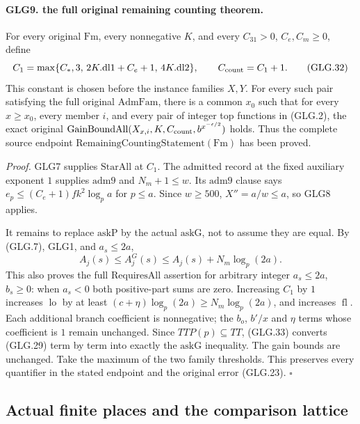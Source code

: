 \documentclass[11pt,a4paper]{article}
\numberwithin{equation}{section}
\theoremstyle{remark}\newtheorem{remark}[theorem]{Remark}
\begin{document}
\paragraph{GLG9. the full original remaining counting theorem.}
\label{claim:GLG9}
For every original \(\mathrm{Fm}\), every nonnegative \(K\),
and every \(C_{31}>0\), \(C_e,C_m\ge0\), define
\[
 C_1=\max\{C_*,3,\,2K.\mathrm{dl1}+C_e+1,\,
                                      4K.\mathrm{dl2}\},
                  \qquad C_{\rm count}=C_1+1.                    \tag{GLG.32}
\]
This constant is chosen before the instance families \(X,Y\).
For every such pair satisfying the full original
\(\mathrm{AdmFam}\), there is a common \(x_0\) such that
for every \(x\ge x_0\), every member \(i\), and every pair
of integer top functions in (GLG.2), the exact original
\(\mathrm{GainBoundAll}(X_{x,i},K,C_{\rm count},
                 b^{x^{-\epsilon/2}})\) holds.
Thus the complete source endpoint
\(\mathrm{RemainingCountingStatement}(\mathrm{Fm})\)
has been proved.

\emph{Proof.}
GLG7 supplies \(\mathrm{StarAll}\) at \(C_1\).
The admitted record at the fixed auxiliary exponent \(1\)
supplies \(\mathrm{adm9}\) and \(N_m+1\le w\).
Its \(\mathrm{adm9}\) clause says
\(e_p\le(C_e+1)fk^2\log_pa\) for \(p\le a\).
Since \(w\ge500\), \(X''=a/w\le a\), so GLG8 applies.

It remains to replace \(\mathrm{askP}\) by the actual
\(\mathrm{askG}\), not to assume they are equal. By (GLG.7),
GLG1, and \(a_s\le2a\),
\[
           A_j(s)\le A_j^G(s)
                \le A_j(s)+N_m\log_p(2a).                         \tag{GLG.33}
\]
This also proves the full \(\mathrm{RequiresAll}\) assertion
for arbitrary integer \(a_s\le2a\), \(b_s\ge0\): when
\(a_s<0\) both positive-part sums are zero.
Increasing \(C_1\) by \(1\) increases
\(\operatorname{lo}\) by at least
\((c+\eta)\log_p(2a)\ge N_m\log_p(2a)\), and increases
\(\operatorname{fl}\). Each additional branch coefficient
is nonnegative; the \(b_o\), \(b'/x\) and \(\eta\) terms
whose coefficient is \(1\) remain unchanged.
Since \(TTP(p)\subseteq TT\), (GLG.33) converts (GLG.29)
term by term into exactly the \(\mathrm{askG}\) inequality.
The gain bounds are unchanged. Take the maximum of the
two family thresholds. This preserves every quantifier
in the stated endpoint and the original error (GLG.23).
\hfill\(\square\)

\subsection{Actual finite places and the comparison lattice}
\end{document}
